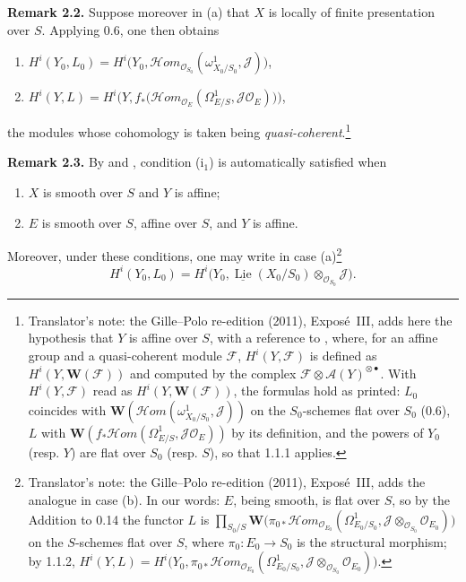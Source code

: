 \medskip
\noindent{}\textbf{Remark 2.2.}
Suppose moreover in (a) that \(X\) is locally of finite presentation over
\(S\). Applying 0.6, one then obtains
\begin{enumerate}
\item[a)] \(H^i(Y_0,L_0)=H^i\bigl(Y_0,\mathscr{H}om_{\mathscr O_{S_0}}
  (\omega^1_{X_0/S_0},\mathscr J)\bigr)\),
\item[b)] \(H^i(Y,L)=H^i\bigl(Y,f_*\bigl(\mathscr{H}om_{\mathscr O_E}
  (\Omega^1_{E/S},\mathscr J\mathscr O_E)\bigr)\bigr)\),
\end{enumerate}
the modules whose cohomology is taken being
\emph{quasi-coherent}.\footnote{Translator's note: the Gille--Polo re-edition (2011), Exposé~III, adds here the hypothesis that
\(Y\) is affine over \(S\), with a reference to
, where, for an affine group
and a quasi-coherent module \(\mathscr F\), \(H^i(Y,\mathscr F)\) is defined as
\(H^i(Y,\mathbf W(\mathscr F))\) and computed by the complex
\(\mathscr F\otimes\mathscr A(Y)^{\otimes\bullet}\). With \(H^i(Y,\mathscr F)\)
read as \(H^i(Y,\mathbf W(\mathscr F))\), the formulas hold as printed: \(L_0\)
coincides with \(\mathbf W(\mathscr{H}om(\omega^1_{X_0/S_0},\mathscr J))\) on
the \(S_0\)-schemes flat over \(S_0\) (0.6), \(L\) with
\(\mathbf W(f_*\mathscr{H}om(\Omega^1_{E/S},\mathscr J\mathscr O_E))\) by its
definition, and the powers of \(Y_0\) (resp. \(Y\)) are flat over \(S_0\)
(resp. \(S\)), so that 1.1.1 applies.}

\medskip
\noindent{}\textbf{Remark 2.3.}
By  and , condition (i\(_1\)) is automatically satisfied when
\begin{enumerate}
\item[a)] \(X\) is smooth over \(S\) and \(Y\) is affine;
\item[b)] \(E\) is smooth over \(S\), affine over \(S\), and \(Y\) is affine.
\end{enumerate}
Moreover, under these conditions, one may write in case
(a)\footnote{Translator's note: the Gille--Polo re-edition (2011), Exposé~III, adds the analogue in case (b). In our words: \(E\),
being smooth, is flat over \(S\), so by the Addition to 0.14 the functor \(L\)
is \(\prod_{S_0/S}\mathbf W\bigl(\pi_{0*}\mathscr{H}om_{\mathscr O_{E_0}}
(\Omega^1_{E_0/S_0},\mathscr J\otimes_{\mathscr O_{S_0}}\mathscr O_{E_0})\bigr)\)
on the \(S\)-schemes flat over \(S\), where \(\pi_0\colon E_0\to S_0\) is the
structural morphism; by 1.1.2, \(H^i(Y,L)=H^i\bigl(Y_0,\pi_{0*}\mathscr{H}om
_{\mathscr O_{E_0}}(\Omega^1_{E_0/S_0},\mathscr J\otimes_{\mathscr O_{S_0}}
\mathscr O_{E_0})\bigr)\).}
\[
 H^i(Y_0,L_0)=H^i\bigl(Y_0,\underline{\operatorname{Lie}}(X_0/S_0)
 \otimes_{\mathscr O_{S_0}}\mathscr J\bigr).
\]

